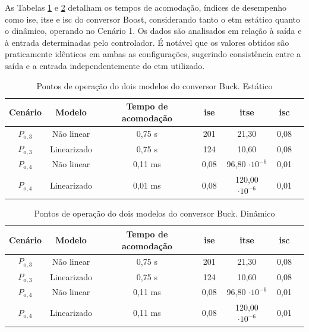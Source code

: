 As Tabelas \ref{table:indices_desempenho_etm_estático_boost} e \ref{table:indices_desempenho_etm_dinamico_boost} detalham os tempos de acomodação, índices de desempenho como \acrshort{ise}, \acrshort{itse} e \acrshort{isc} do conversor Boost, considerando tanto o \acrshort{etm} estático quanto o dinâmico, operando no Cenário 1. Os dados são analisados em relação à saída e à entrada determinadas pelo controlador. É notável que os valores obtidos são praticamente idênticos em ambas as configurações, sugerindo consistência entre a saída e a entrada independentemente do \acrshort{etm} utilizado. 

\vspace{8pt}
\begin{table}[H]
  \centering
  \setlength{\tabcolsep}{10pt}
  \begin{tabular}{ccccccc}
    \toprule
    Cenário & Modelo      & Tempo de acomodação & \acrshort{ise} & \acrshort{itse}        & \acrshort{isc} \\
    \midrule
    $P_{\mathrm{o}, 3}$       & Não linear  & 0,75 s              & 201            & 21,30                  & 0,08           \\
    $P_{\mathrm{o}, 3}$       & Linearizado & 0,75 s              & 124            & 10,60                  & 0,08           \\
    $P_{\mathrm{o}, 4}$       & Não linear  & 0,11 ms             & 0,08           & 96,80 $\cdot 10^{-6}$  & 0,01           \\
    $P_{\mathrm{o}, 4}$       & Linearizado & 0,01 ms             & 0,08           & 120,00 $\cdot 10^{-6}$ & 0,01           \\
    \bottomrule
  \end{tabular}
  \caption{Pontos de operação do dois modelos do conversor Buck. Estático}
  \label{table:indices_desempenho_etm_estático_boost}
\end{table}

\vspace{8pt}
\begin{table}[H]
  \centering
  \setlength{\tabcolsep}{10pt}
  \begin{tabular}{ccccccc}
    \toprule
    Cenário & Modelo      & Tempo de acomodação & \acrshort{ise} & \acrshort{itse}        & \acrshort{isc} \\
    \midrule
    $P_{\mathrm{o}, 3}$       & Não linear  & 0,75 s              & 201            & 21,30                  & 0,08           \\
    $P_{\mathrm{o}, 3}$       & Linearizado & 0,75 s              & 124            & 10,60                  & 0,08           \\
    $P_{\mathrm{o}, 4}$       & Não linear  & 0,11 ms             & 0,08           & 96,80 $\cdot 10^{-6}$  & 0,01           \\
    $P_{\mathrm{o}, 4}$       & Linearizado & 0,11 ms             & 0,08           & 120,00 $\cdot 10^{-6}$ & 0,01           \\
    \bottomrule
  \end{tabular}
  \caption{Pontos de operação do dois modelos do conversor Buck. Dinâmico}
  \label{table:indices_desempenho_etm_dinamico_boost}
\end{table}
